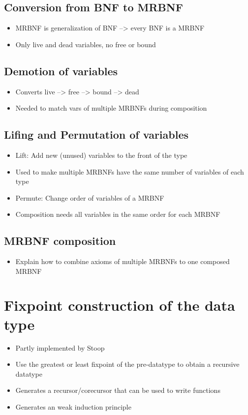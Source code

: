 \subsection{Conversion from BNF to MRBNF}\label{sec:bnf_to_mrbnf}

\begin{itemize}
\item{MRBNF is generalization of BNF --> every BNF is a MRBNF}
\item{Only live and dead variables, no free or bound}
\end{itemize}

\subsection{Demotion of variables}\label{sec:demote}

\begin{itemize}
\item{Converts live --> free --> bound --> dead}
\item{Needed to match vars of multiple MRBNFs during composition}
\end{itemize}

\subsection{Lifing and Permutation of variables}\label{sec:lift}

\begin{itemize}
\item{Lift: Add new (unused) variables to the front of the type}
\item{Used to make multiple MRBNFs have the same number of variables of each type}
\item{Permute: Change order of variables of a MRBNF}
\item{Composition needs all variables in the same order for each MRBNF}
\end{itemize}

\subsection{MRBNF composition}

\begin{itemize}
\item{Explain how to combine axioms of multiple MRBNFs to one composed MRBNF}
\end{itemize}

\section{Fixpoint construction of the data type}

\begin{itemize}
\item{Partly implemented by Stoop~\cite{mrbnf_fixpoint}}
\item{Use the greatest or least fixpoint of the pre-datatype to obtain a recursive datatype}
\item{Generates a recursor/corecursor that can be used to write functions}
\item{Generates an weak induction principle}
\end{itemize}
